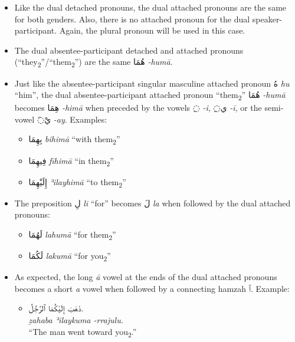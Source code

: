 \documentclass[
  10pt,
]{book}
\providecommand{\tightlist}{%
  \setlength{\itemsep}{0pt}\setlength{\parskip}{0pt}}
\begin{document}
\begin{itemize}
\item
  Like the dual detached pronouns, the dual attached pronouns are the same for both genders. Also, there is no attached pronoun for the dual speaker-participant. Again, the plural pronoun will be used in this case.
\item
  The dual absentee-participant detached and attached pronouns (\enquote{they\textsubscript{2}}/\enquote{them\textsubscript{2}}) are the same \foreignlanguage{arabic}{هُمَا} \emph{-humā}.
\item
  Just like the absentee-participant singular masculine attached pronoun \foreignlanguage{arabic}{هُ} \emph{hu} \enquote{him}, the dual absentee-participant attached pronoun \enquote{them\textsubscript{2}} \foreignlanguage{arabic}{هُمَا} \emph{-humā} becomes \foreignlanguage{arabic}{هِمَا} \emph{-himā} when preceded by the vowels \foreignlanguage{arabic}{◌ِ} \emph{-i}, \foreignlanguage{arabic}{◌ِي} \emph{-ī}, or the semi-vowel \foreignlanguage{arabic}{◌َيْ} \emph{-ay}. Examples:

  \begin{itemize}
  \tightlist
  \item
    \foreignlanguage{arabic}{بِهِمَا} \emph{bihimā} \enquote{with them\textsubscript{2}}
  \item
    \foreignlanguage{arabic}{فِيهِمَا} \emph{fīhimā} \enquote{in them\textsubscript{2}}
  \item
    \foreignlanguage{arabic}{إِلَيْهِمَا} \emph{ʾilayhimā} \enquote{to them\textsubscript{2}}
  \end{itemize}
\item
  The preposition \foreignlanguage{arabic}{لِ} \emph{li} \enquote{for} becomes \foreignlanguage{arabic}{لَ} \emph{la} when followed by the dual attached pronouns:

  \begin{itemize}
  \tightlist
  \item
    \foreignlanguage{arabic}{لَهُمَا} \emph{lahumā} \enquote{for them\textsubscript{2}}
  \item
    \foreignlanguage{arabic}{لَکُمَا} \emph{lakumā} \enquote{for you\textsubscript{2}}
  \end{itemize}
\item
  As expected, the long \emph{ā} vowel at the ends of the dual attached pronouns becomes a short \emph{a} vowel when followed by a connecting hamzah \foreignlanguage{arabic}{ٱ}. Example:

  \begin{itemize}
  \tightlist
  \item
    \foreignlanguage{arabic}{ذَهَبَ إِلَيْکُمَا ٱلرَّجُلُ.}\\
    \emph{ẕahaba ʾilaykuma -rrajulu.}\\
    \enquote{The man went toward you\textsubscript{2}.}
  \end{itemize}
\end{itemize}
\end{document}
